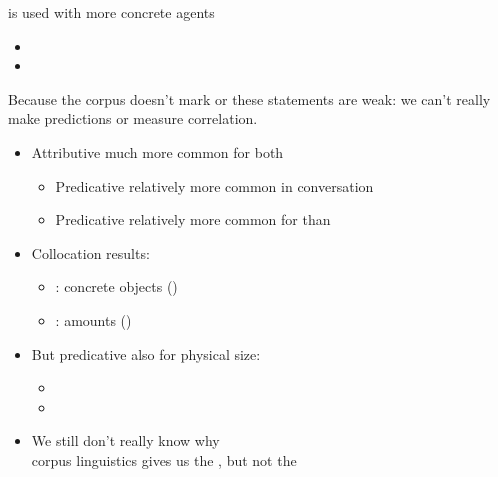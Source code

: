 \documentclass[a4paper,landscape,headrule,footrule,xetex]{foils}
\begin{document}
 is used with more concrete agents
\begin{itemize}
\item {}
\item {}
\end{itemize}

Because the corpus doesn't mark  or  these
statements are weak: we can't really make predictions or measure correlation.



\begin{itemize}
\item Attributive much more common for both
  \begin{itemize}
  \item Predicative relatively more common in conversation
  \item Predicative relatively more common for  than 
  \end{itemize}
\item Collocation results:
  \begin{itemize}
  \item {}: concrete objects ()
  \item {}: amounts  ()
  \end{itemize}
\item But predicative  also for physical size:
  \begin{itemize}
  \item {}
  \item {}
  \end{itemize}
\item We still don't really know why \frownie
 \\ corpus linguistics gives us the , but not the 
\end{itemize}

\end{document}
